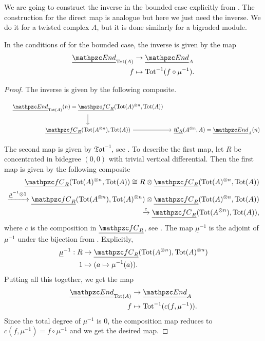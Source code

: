 \documentclass[Thesis.tex]{subfiles}
\begin{document}
We are going to construct the inverse in the bounded case explicitly from . The construction for the direct map is analogue but here we just need the inverse. We do it for a twisted complex $A$, but it is done similarly for a bigraded module.

\begin{lem}\label{composition}
In the conditions of  for the bounded case, the inverse is given by the map
\begin{align*}
\uEnd_{\Tot(A)}&\to\uEnd_A\\
f & \mapsto \Tot^{-1}(f\circ \mu^{-1}).
\end{align*}
\end{lem}

\begin{proof}
The inverse is given by the following composite.

\[
\begin{tikzcd}[column sep = 1em]
&\uEnd_{\Tot(A)}(n)=\ufC(\Tot(A)^{\otimes n},\Tot(A))\arrow[d]&\\
& \ufC(\Tot(A^{\otimes n}),\Tot(A))\arrow[r]&\utC(A^{\otimes n},A)=\uEnd_A(n)
\end{tikzcd}
 \]

The second map is given by $\mathfrak{Tot}^{-1}$, see . To describe the first map, let $R$ be concentrated in bidegree $(0,0)$ with trivial vertical differential. Then the first map is given by the following composite
\begin{align*}
\ufC(\Tot(A)^{\otimes n},\Tot(A))\cong R\otimes\ufC(\Tot(A)^{\otimes n},\Tot(A))\\
\xrightarrow{\underline{\mu}^{-1}\otimes 1}\ufC(\Tot(A^{\otimes n}),\Tot(A)^{\otimes n})\otimes\ufC(\Tot(A)^{\otimes n},\Tot(A))\\
\xrightarrow{c}\ufC(\Tot(A^{\otimes n}),\Tot(A)), 
\end{align*}
where $c$ is the composition in $\ufC$, see . The map $\underline{\mu}^{-1}$ is the adjoint of $\mu^{-1}$ under the bijection from . Explicitly,
\begin{align*}
\underline{\mu}^{-1}:R &\to \ufC(\Tot(A^{\otimes n}),\Tot(A)^{\otimes n})\\
1 &\mapsto (a\mapsto \mu^{-1}(a)).
\end{align*}
Putting all this together, we get the map 
\begin{align*}
\uEnd_{\Tot(A)}&\to\uEnd_A\\
f & \mapsto \Tot^{-1}(c(f, \mu^{-1})).
\end{align*}
Since the total degree of $\mu^{-1}$ is 0, the composition map reduces to $c(f,\mu^{-1})=f\circ \mu^{-1}$ and we get the desired map.
\end{proof}
\end{document}
